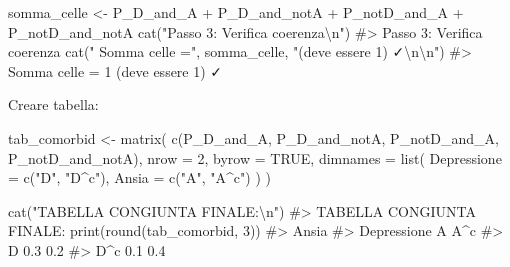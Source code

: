 \documentclass[
  letterpaper,
  DIV=11,
  numbers=noendperiod,
  oneside]{scrreprt}
\newenvironment{Shaded}{\begin{snugshade}}{\end{snugshade}}
\newcommand{\AttributeTok}[1]{\textcolor[rgb]{0.40,0.45,0.13}{#1}}
\newcommand{\CommentTok}[1]{\textcolor[rgb]{0.37,0.37,0.37}{#1}}
\newcommand{\ConstantTok}[1]{\textcolor[rgb]{0.56,0.35,0.01}{#1}}
\newcommand{\DecValTok}[1]{\textcolor[rgb]{0.68,0.00,0.00}{#1}}
\newcommand{\FunctionTok}[1]{\textcolor[rgb]{0.28,0.35,0.67}{#1}}
\newcommand{\NormalTok}[1]{\textcolor[rgb]{0.00,0.23,0.31}{#1}}
\newcommand{\OtherTok}[1]{\textcolor[rgb]{0.00,0.23,0.31}{#1}}
\newcommand{\SpecialCharTok}[1]{\textcolor[rgb]{0.37,0.37,0.37}{#1}}
\newcommand{\StringTok}[1]{\textcolor[rgb]{0.13,0.47,0.30}{#1}}
\theoremstyle{definition}
\theoremstyle{plain}
\theoremstyle{definition}
\theoremstyle{remark}
\begin{document}
\begin{Shaded}
\begin{Highlighting}[]
\NormalTok{somma\_celle }\OtherTok{\textless{}{-}}\NormalTok{ P\_D\_and\_A }\SpecialCharTok{+}\NormalTok{ P\_D\_and\_notA }\SpecialCharTok{+}\NormalTok{ P\_notD\_and\_A }\SpecialCharTok{+}\NormalTok{ P\_notD\_and\_notA}
\FunctionTok{cat}\NormalTok{(}\StringTok{"Passo 3: Verifica coerenza}\SpecialCharTok{\textbackslash{}n}\StringTok{"}\NormalTok{)}
\CommentTok{\#\textgreater{} Passo 3: Verifica coerenza}
\FunctionTok{cat}\NormalTok{(}\StringTok{"  Somma celle ="}\NormalTok{, somma\_celle, }\StringTok{"(deve essere 1) ✓}\SpecialCharTok{\textbackslash{}n\textbackslash{}n}\StringTok{"}\NormalTok{)}
\CommentTok{\#\textgreater{}   Somma celle = 1 (deve essere 1) ✓}
\end{Highlighting}
\end{Shaded}

Creare tabella:

\begin{Shaded}
\begin{Highlighting}[]
\NormalTok{tab\_comorbid }\OtherTok{\textless{}{-}} \FunctionTok{matrix}\NormalTok{(}
  \FunctionTok{c}\NormalTok{(P\_D\_and\_A, P\_D\_and\_notA,}
\NormalTok{    P\_notD\_and\_A, P\_notD\_and\_notA),}
  \AttributeTok{nrow =} \DecValTok{2}\NormalTok{, }\AttributeTok{byrow =} \ConstantTok{TRUE}\NormalTok{,}
  \AttributeTok{dimnames =} \FunctionTok{list}\NormalTok{(}
    \AttributeTok{Depressione =} \FunctionTok{c}\NormalTok{(}\StringTok{"D"}\NormalTok{, }\StringTok{"D\^{}c"}\NormalTok{),}
    \AttributeTok{Ansia =} \FunctionTok{c}\NormalTok{(}\StringTok{"A"}\NormalTok{, }\StringTok{"A\^{}c"}\NormalTok{)}
\NormalTok{  )}
\NormalTok{)}

\FunctionTok{cat}\NormalTok{(}\StringTok{"TABELLA CONGIUNTA FINALE:}\SpecialCharTok{\textbackslash{}n}\StringTok{"}\NormalTok{)}
\CommentTok{\#\textgreater{} TABELLA CONGIUNTA FINALE:}
\FunctionTok{print}\NormalTok{(}\FunctionTok{round}\NormalTok{(tab\_comorbid, }\DecValTok{3}\NormalTok{))}
\CommentTok{\#\textgreater{}            Ansia}
\CommentTok{\#\textgreater{} Depressione   A A\^{}c}
\CommentTok{\#\textgreater{}         D   0.3 0.2}
\CommentTok{\#\textgreater{}         D\^{}c 0.1 0.4}
\end{Highlighting}
\end{Shaded}
\end{document}
